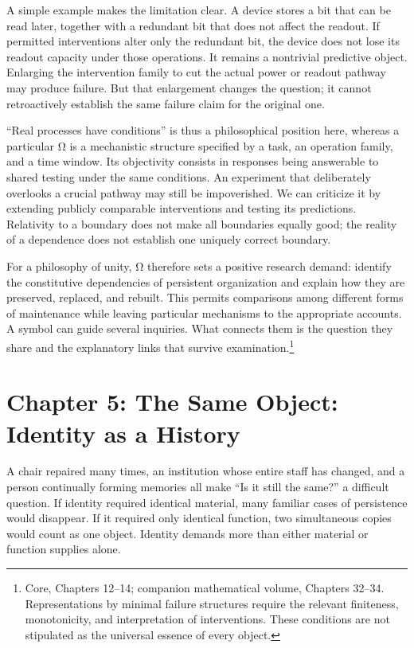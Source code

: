 \documentclass[
  english,
  11pt,
  oneside]{book}
\begin{document}
A simple example makes the limitation clear. A device stores a bit that can be read later, together with a redundant bit that does not affect the readout. If permitted interventions alter only the redundant bit, the device does not lose its readout capacity under those operations. It remains a nontrivial predictive object. Enlarging the intervention family to cut the actual power or readout pathway may produce failure. But that enlargement changes the question; it cannot retroactively establish the same failure claim for the original one.

``Real processes have conditions'' is thus a philosophical position here, whereas a particular Ω is a mechanistic structure specified by a task, an operation family, and a time window. Its objectivity consists in responses being answerable to shared testing under the same conditions. An experiment that deliberately overlooks a crucial pathway may still be impoverished. We can criticize it by extending publicly comparable interventions and testing its predictions. Relativity to a boundary does not make all boundaries equally good; the reality of a dependence does not establish one uniquely correct boundary.

\begingroup{}

For a philosophy of unity, Ω therefore sets a positive research demand: identify the constitutive dependencies of persistent organization and explain how they are preserved, replaced, and rebuilt. This permits comparisons among different forms of maintenance while leaving particular mechanisms to the appropriate accounts. A symbol can guide several inquiries. What connects them is the question they share and the explanatory links that survive examination.\footnote{\hypertarget{ph-note-11}{}Core, Chapters 12--14; companion mathematical volume, Chapters 32--34. Representations by minimal failure structures require the relevant finiteness, monotonicity, and interpretation of interventions. These conditions are not stipulated as the universal essence of every object.}

\par\endgroup

\chapter{Chapter 5: The Same Object: Identity as a History}\label{ph-ch-05}

A chair repaired many times, an institution whose entire staff has changed, and a person continually forming memories all make ``Is it still the same?'' a difficult question. If identity required identical material, many familiar cases of persistence would disappear. If it required only identical function, two simultaneous copies would count as one object. Identity demands more than either material or function supplies alone.
\end{document}
